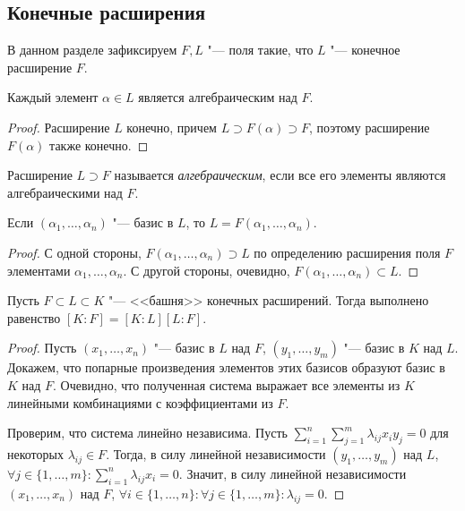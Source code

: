 \subsection{Конечные расширения}

В данном разделе зафиксируем $F, L$ "--- поля такие, что $L$ "--- конечное расширение $F$.

\begin{proposition}
	Каждый элемент $\alpha \in L$ является алгебраическим над $F$.
\end{proposition}

\begin{proof}
	Расширение $L$ конечно, причем $L \supset F(\alpha) \supset F$, поэтому расширение $F(\alpha)$ также конечно.
\end{proof}

\begin{definition}
	Расширение $L \supset F$ называется \textit{алгебраическим}, если все его элементы являются алгебраическими над $F$.
\end{definition}

\begin{proposition}
	Если $(\alpha_1, \dotsc, \alpha_n)$ "--- базис в $L$, то $L = F(\alpha_1, \dotsc, \alpha_n)$.
\end{proposition}

\begin{proof}
	С одной стороны, $F(\alpha_1, \dotsc, \alpha_n) \supset L$ по определению расширения поля $F$ элементами $\alpha_1, \dotsc, \alpha_n$. С другой стороны, очевидно, $F(\alpha_1, \dotsc, \alpha_n) \subset L$.
\end{proof}

\begin{proposition}
	Пусть $F \subset L \subset K$ "--- <<башня>> конечных расширений. Тогда выполнено равенство $[K : F] = [K : L][L : F]$.
\end{proposition}

\begin{proof}
	Пусть $(x_1, \dotsc, x_n)$ "--- базис в $L$ над $F$, $(y_1, \dotsc, y_m)$ "--- базис в $K$ над $L$. Докажем, что попарные произведения элементов этих базисов образуют базис в $K$ над $F$. Очевидно, что полученная система выражает все элементы из $K$ линейными комбинациями с коэффициентами из $F$.
	
	Проверим, что система линейно независима. Пусть $\sum_{i = 1}^n\sum_{j = 1}^m \lambda_{ij}x_iy_j = 0$ для некоторых $\lambda_{ij} \in F$. Тогда, в силу линейной независимости $(y_1, \dotsc, y_m)$ над $L$, $\forall j \in \{1, \dotsc, m\}: \sum_{i = 1}^n\lambda_{ij}x_i = 0$. Значит, в силу линейной независимости $(x_1, \dotsc, x_n)$ над $F$, $\forall i \in \{1, \dotsc, n\}: \forall j \in \{1, \dotsc, m\}: \lambda_{ij} = 0$.
\end{proof}

